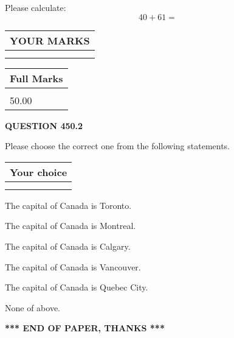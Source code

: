 \documentclass[12pt]{article}
\begin{document}
  
 
Please calculate:
\begin{equation}
40 +  %
61 = \nonumber
\end{equation}
 

 

 
  
\vspace{0.2in}
  
\noindent\begin{tabular}{|l|}
\hline
 YOUR MARKS  \\
\hline
 \\ 
 \\ 
\hline
\end{tabular}
\hspace{0.05in} \begin{tabular}{|l|}
\hline
 Full Marks  \\
\hline
 \\ 
50.00 \\
\hline
\end{tabular}
{\textbf{\Large{QUESTION
450.2 
}}}
  
  
Please choose the correct one from the following statements.
  
  
\noindent\hspace{3.0in} \begin{tabular}{|l|}
\hline
Your choice \\
\hline
 \\ 
 \\ 
\hline
\end{tabular}
  
  
 
 
The capital of Canada is Toronto.
 
 
The capital of Canada is Montreal.
 
 
The capital of Canada is Calgary.
 
 
The capital of Canada is Vancouver.
 
 
The capital of Canada is Quebec City.
 
 
 None of above.
 
 
   
   
 \vspace{0.2in}
 
   
   
   
   
\vspace{1.0in} 
{\textbf{\large{ *** END OF PAPER, THANKS *** }}} 
   
\end{document}

